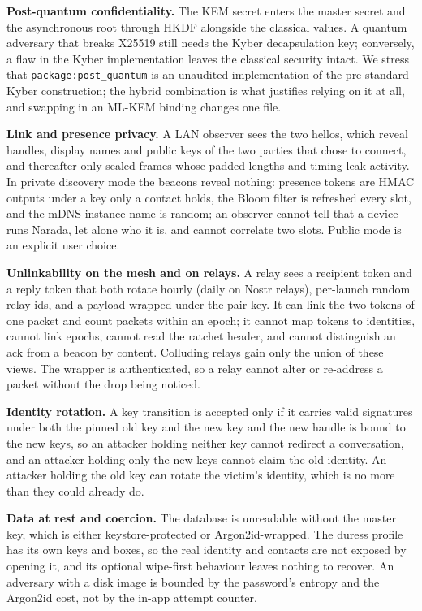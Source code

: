 \documentclass[conference]{IEEEtran}
\begin{document}
\textbf{Post-quantum confidentiality.} The KEM secret enters the master secret and the asynchronous root through HKDF alongside the classical values. A quantum adversary that breaks X25519 still needs the Kyber decapsulation key; conversely, a flaw in the Kyber implementation leaves the classical security intact. We stress that \texttt{package:post\_quantum} is an unaudited implementation of the pre-standard Kyber construction; the hybrid combination is what justifies relying on it at all, and swapping in an ML-KEM binding changes one file.

\textbf{Link and presence privacy.} A LAN observer sees the two hellos, which reveal handles, display names and public keys of the two parties that chose to connect, and thereafter only sealed frames whose padded lengths and timing leak activity. In private discovery mode the beacons reveal nothing: presence tokens are HMAC outputs under a key only a contact holds, the Bloom filter is refreshed every slot, and the mDNS instance name is random; an observer cannot tell that a device runs Narada, let alone who it is, and cannot correlate two slots. Public mode is an explicit user choice.

\textbf{Unlinkability on the mesh and on relays.} A relay sees a recipient token and a reply token that both rotate hourly (daily on Nostr relays), per-launch random relay ids, and a payload wrapped under the pair key. It can link the two tokens of one packet and count packets within an epoch; it cannot map tokens to identities, cannot link epochs, cannot read the ratchet header, and cannot distinguish an ack from a beacon by content. Colluding relays gain only the union of these views. The wrapper is authenticated, so a relay cannot alter or re-address a packet without the drop being noticed.

\textbf{Identity rotation.} A key transition is accepted only if it carries valid signatures under both the pinned old key and the new key and the new handle is bound to the new keys, so an attacker holding neither key cannot redirect a conversation, and an attacker holding only the new keys cannot claim the old identity. An attacker holding the old key can rotate the victim's identity, which is no more than they could already do.

\textbf{Data at rest and coercion.} The database is unreadable without the master key, which is either keystore-protected or Argon2id-wrapped. The duress profile has its own keys and boxes, so the real identity and contacts are not exposed by opening it, and its optional wipe-first behaviour leaves nothing to recover. An adversary with a disk image is bounded by the password's entropy and the Argon2id cost, not by the in-app attempt counter.
\end{document}
